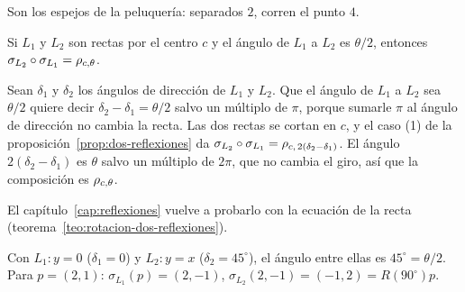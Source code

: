\begin{center}
\end{center}

Son los espejos de la peluquería: separados \(2\), corren el punto \(4\).

\begin{teorema}\label{teo:rotacion-dos-reflexiones-enunciado}
Si \(L_1\) y \(L_2\) son rectas por el centro \(c\) y el ángulo de
\(L_1\) a \(L_2\) es \(\theta/2\), entonces \(\sigma_{L_2}\circ\sigma_{L_1}=\rho_{c,\theta}\).
\end{teorema}

\begin{demostracion}
Sean \(\delta_1\) y \(\delta_2\) los ángulos de dirección de \(L_1\) y \(L_2\). Que el ángulo
de \(L_1\) a \(L_2\) sea \(\theta/2\) quiere decir \(\delta_2-\delta_1=\theta/2\) salvo un
múltiplo de \(\pi\), porque sumarle \(\pi\) al ángulo de dirección no cambia la recta. Las dos
rectas se cortan en \(c\), y el caso (1) de la proposición~\ref{prop:dos-reflexiones} da
\(\sigma_{L_2}\circ\sigma_{L_1}=\rho_{c,\,2(\delta_2-\delta_1)}\). El ángulo
\(2(\delta_2-\delta_1)\) es \(\theta\) salvo un múltiplo de \(2\pi\), que no cambia el giro, así
que la composición es \(\rho_{c,\theta}\).
\end{demostracion}

El capítulo~\ref{cap:reflexiones} vuelve a probarlo con la ecuación de la recta
(teorema~\ref{teo:rotacion-dos-reflexiones}).

\begin{ejemplo}\label{ej:t4}
Con \(L_1\colon y=0\) (\(\delta_1=0\)) y \(L_2\colon y=x\) (\(\delta_2=45^\circ\)), el ángulo
entre ellas es \(45^\circ=\theta/2\). Para \(p=(2,1)\): \(\sigma_{L_1}(p)=(2,-1)\),
\(\sigma_{L_2}(2,-1)=(-1,2)=R(90^\circ)p\).
\end{ejemplo}

